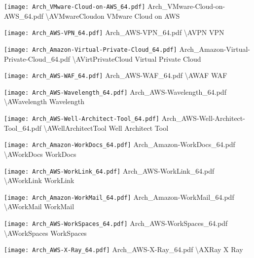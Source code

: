  {\texttt{[image: Arch\_VMware-Cloud-on-AWS\_64.pdf]}} {Arch\_VMware-Cloud-on-AWS\_64.pdf} {{\textbackslash}AVMwareCloudon} {VMware Cloud on AWS}

 {\texttt{[image: Arch\_AWS-VPN\_64.pdf]}} {Arch\_AWS-VPN\_64.pdf} {{\textbackslash}AVPN} {VPN}

 {\texttt{[image: Arch\_Amazon-Virtual-Private-Cloud\_64.pdf]}} {Arch\_Amazon-Virtual-Private-Cloud\_64.pdf} {{\textbackslash}AVirtPrivateCloud} {Virtual Private Cloud}

 {\texttt{[image: Arch\_AWS-WAF\_64.pdf]}} {Arch\_AWS-WAF\_64.pdf} {{\textbackslash}AWAF} {WAF}

 {\texttt{[image: Arch\_AWS-Wavelength\_64.pdf]}} {Arch\_AWS-Wavelength\_64.pdf} {{\textbackslash}AWavelength} {Wavelength}

 {\texttt{[image: Arch\_AWS-Well-Architect-Tool\_64.pdf]}} {Arch\_AWS-Well-Architect-Tool\_64.pdf} {{\textbackslash}AWellArchitectTool} {Well Architect Tool}

 {\texttt{[image: Arch\_Amazon-WorkDocs\_64.pdf]}} {Arch\_Amazon-WorkDocs\_64.pdf} {{\textbackslash}AWorkDocs} {WorkDocs}

 {\texttt{[image: Arch\_AWS-WorkLink\_64.pdf]}} {Arch\_AWS-WorkLink\_64.pdf} {{\textbackslash}AWorkLink} {WorkLink}

 {\texttt{[image: Arch\_Amazon-WorkMail\_64.pdf]}} {Arch\_Amazon-WorkMail\_64.pdf} {{\textbackslash}AWorkMail} {WorkMail}

 {\texttt{[image: Arch\_AWS-WorkSpaces\_64.pdf]}} {Arch\_AWS-WorkSpaces\_64.pdf} {{\textbackslash}AWorkSpaces} {WorkSpaces}

 {\texttt{[image: Arch\_AWS-X-Ray\_64.pdf]}} {Arch\_AWS-X-Ray\_64.pdf} {{\textbackslash}AXRay} {X Ray}

\archEnd

